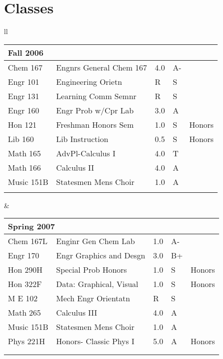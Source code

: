 \documentclass[oneside]{article}
\begin{document}
\section{Classes}

{\footnotesize

  \begin{tabular}{ll}
  
    
    \begin{tabular}{p{1.5cm} p{3.5cm} p{.3cm} p{.3cm} p{0.75cm}}
      \multicolumn{4}{l}{Fall 2006} &\\
      \hline
      Chem 167 & Engnrs General Chem 167 & 4.0 & A- & \\
      Engr 101 & Engineering Orietn  & R & S &\\
      Engr 131 & Learning Comm Semnr & R & S &\\
      Engr 160 & Engr Prob w/Cpr Lab & 3.0 & A &\\
      Hon 121 & Freshman Honors Sem & 1.0 & S & Honors\\
      Lib 160 & Lib Instruction  & 0.5 & S & Honors\\
      Math 165 & AdvPl-Calculus I & 4.0 & T &\\
      Math 166 & Calculus II & 4.0 & A &\\
      Music 151B  & Statesmen Mens Choir & 1.0 & A &\\ 
      \\
    \end{tabular}
    &
    \begin{tabular}{p{1.5cm} p{3.5cm} p{.3cm} p{.3cm} p{0.75cm}}
      \multicolumn{5}{l}{Spring 2007}\\
      \hline
      Chem 167L & Enginr Gen Chem Lab & 1.0  & A- &\\
      Engr 170 & Engr Graphics and Desgn & 3.0 & B+ &\\
      Hon 290H & Special Prob Honors & 1.0 & S & Honors\\
      Hon 322F & Data: Graphical, Visual & 1.0 & S & Honors\\
      M E 102 & Mech Engr Orientatn & R & S &\\
      Math 265 & Calculus III & 4.0 & A &\\
      Music 151B & Statesmen Mens Choir & 1.0 & A &\\
      Phys 221H & Honors- Classic Phys I & 5.0 & A & Honors\\
      \\
      \\
    \end{tabular}
    \\
  

\end{tabular}}
\end{document}
